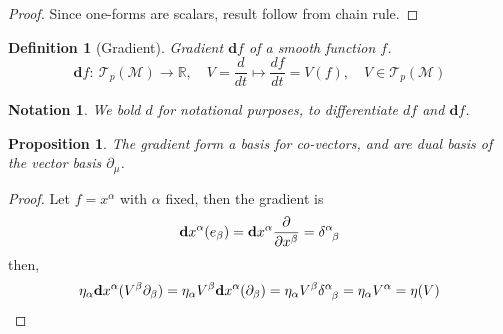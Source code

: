 \documentclass[a4paper]{article}
\newtheorem{notation}{Notation}[section]
\theoremstyle{new}
\newtheorem{defi}{Definition}[section]
\newtheorem{prop}{Proposition}[section]
\begin{document}
\begin{proof}
Since one-forms are scalars, result follow from chain rule.
\end{proof}
\begin{defi}[Gradient]
Gradient $\mathbf{d}f$ of a smooth function $f$.
$$\mathbf{d}f:~\mathcal{T}_p(\mathcal{M})\rightarrow\mathbb{R},\quad V=\frac{d}{dt}\mapsto\frac{df}{dt}=V(f),\quad V\in \mathcal{T}_p(\mathcal{M})$$
\end{defi}
\begin{notation}
We bold $d$ for notational purposes, to differentiate $df$ and $\mathbf{d}f$.
\end{notation}
\begin{prop}
The gradient form a basis for co-vectors, and are dual basis of the vector basis $\partial_\mu$. 
\end{prop}
\begin{proof}
Let $f=x^\alpha$ with $\alpha$ fixed, then the gradient is
$$\mathbf{d}x^\alpha(e_\beta)=\mathbf{d}x^\alpha\frac{\partial}{\partial x^\beta}=\tensor*{\delta}{*_{}^{\alpha}_{\beta}}$$
then,
$$\eta_\alpha\mathbf{d}x^\alpha(V^\beta\partial_\beta)=\eta_\alpha V^\beta\mathbf{d}x^\alpha(\partial_\beta)=\eta_\alpha V^\beta\tensor*{\delta}{*_{}^{\alpha}_{\beta}}=\eta_\alpha V^\alpha=\eta(V)$$
\end{proof}
\end{document}
